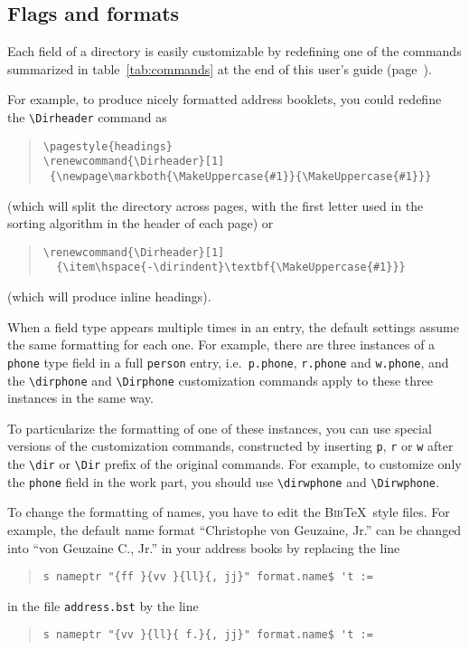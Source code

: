 \documentclass[10pt]{article}
\renewcommand{\Dirheader}[1]{\item\hspace{-\dirindent}\textbf{\MakeUppercase{#1}}}
\newcommand{\BibTeX}{\textsc{Bib}\TeX}
\begin{document}
\subsection{Flags and formats}
\label{sec:flagsformats}

Each field of a directory is easily customizable by redefining one of the
commands summarized in table~\ref{tab:commands} at the end of this user's
guide (page~\pageref{tab:commands}).

For example, to produce nicely formatted address booklets, you could
redefine the \verb'\Dirheader' command as
\begin{quote}
\begin{verbatim}
\pagestyle{headings}
\renewcommand{\Dirheader}[1]
 {\newpage\markboth{\MakeUppercase{#1}}{\MakeUppercase{#1}}}
\end{verbatim}
\end{quote}
(which will split the directory across pages, with the first letter used in
the sorting algorithm in the header of each page) or
\begin{quote}
\begin{verbatim}
\renewcommand{\Dirheader}[1]
  {\item\hspace{-\dirindent}\textbf{\MakeUppercase{#1}}}
\end{verbatim}
\end{quote}
(which will produce inline headings).

When a field type appears multiple times in an entry, the default settings
assume the same formatting for each one. For example, there are three
instances of a \texttt{phone} type field in a full \texttt{person} entry,
i.e.\ \texttt{p.phone}, \texttt{r.phone} and \texttt{w.phone}, and the
\verb'\dirphone' and \verb'\Dirphone' customization commands apply to these
three instances in the same way.

To particularize the formatting of one of these instances, you can use
special versions of the customization commands, constructed by inserting
\texttt{p}, \texttt{r} or \texttt{w} after the \verb'\dir' or \verb'\Dir'
prefix of the original commands. For example, to customize only the
\texttt{phone} field in the work part, you should use \verb'\dirwphone' and
\verb'\Dirwphone'. 

To change the formatting of names, you have to edit the \BibTeX\ style
files. For example, the default name format ``Christophe von Geuzaine, Jr.''
can be changed into ``von Geuzaine C., Jr.'' in your address books by replacing the line
\begin{quote}
\begin{verbatim}
s nameptr "{ff }{vv }{ll}{, jj}" format.name$ 't :=
\end{verbatim}
\end{quote}
in the file \texttt{address.bst} by the line
\begin{quote}
\begin{verbatim}
s nameptr "{vv }{ll}{ f.}{, jj}" format.name$ 't :=
\end{verbatim}
\end{quote}
\end{document}
